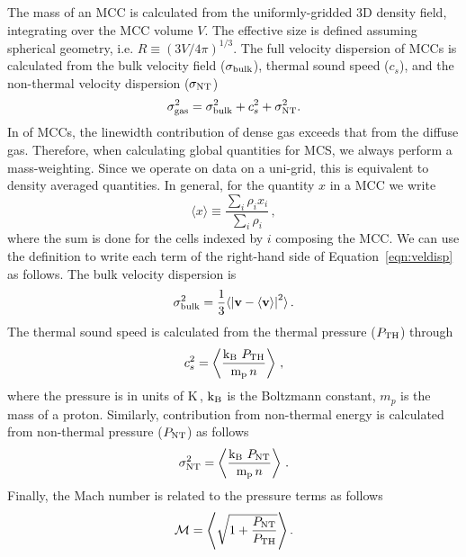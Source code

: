 \IfFileExists{emulateapjlegacy.cls}{\documentclass[iop]{emulateapjlegacy}}{\documentclass[iop]{emulateapj}}
\begin{document}
The mass of an MCC is calculated from the uniformly-gridded 3D density field, integrating over the MCC volume $V$. The effective size is defined assuming spherical geometry, i.e. $R \equiv (3 V /4 \pi)^{1/3}$.
%
The full velocity dispersion of MCCs is calculated from the bulk velocity field ($\sigma_{\rm bulk}$), thermal sound speed ($c_s$), and the non-thermal velocity dispersion ($\sigma_{\rm NT}$)
\begin{equation}
\sigma_{\rm gas}^2 = \sigma_{\rm bulk}^2 + c_s^2 + \sigma_{\rm NT}^2.
\label{eqn:veldisp}
\end{equation}
%
In \obs of MCCs, the linewidth contribution of dense gas exceeds that from the diffuse gas. Therefore, when calculating global quantities for MCS, we always perform a mass-weighting. Since we operate on data on a uni-grid, this is equivalent to density averaged quantities. In general, for the quantity $x$ in a MCC we write
\begin{equation}\label{eqn:defineaverage}
\langle x \rangle \equiv \frac{\sum_{i} \rho_i x_i }{\sum_i \rho_i}\,,
\end{equation}
where the sum is done for the cells indexed by $i$ composing the MCC. We can use the definition  to write each term of the right-hand side of Equation~\ref{eqn:veldisp} as follows.
%
The bulk velocity dispersion is
\begin{equation}
\sigma_{\rm bulk}^2 = \frac{1}{{3}} \langle \left|\mathbf{v} - \langle \mathbf{v} \rangle  \right|^2\rangle \,.
\end{equation}
%
The thermal sound speed is calculated from the thermal pressure ($P_{\rm TH}$) through
\begin{equation}
c_s^2 = \left\langle \frac{{\rm k_B} ~P_{\rm TH}}{{\rm m_p}\, n} \right\rangle\,,
\end{equation}
where the pressure is in units of K\,\cc, $\rm k_B$ is the Boltzmann constant, $m_p$ is the mass of a proton. Similarly, contribution from non-thermal energy is calculated from non-thermal pressure ($P_{\rm NT}$) as follows
\begin{equation}
\sigma_{\rm NT}^2 = \left\langle \frac{{\rm k_B} ~P_{\rm NT}}{{\rm m_p}\, n}\right\rangle\,.
\end{equation}
%
Finally, the Mach number is related to the pressure terms as follows
\begin{equation}
\mathcal{M} = \left\langle \sqrt{ 1 + \frac{P_{\rm NT}}{P_{\rm TH}}} \right\rangle.
\label{eqn:MPress}
\end{equation}
\end{document}
